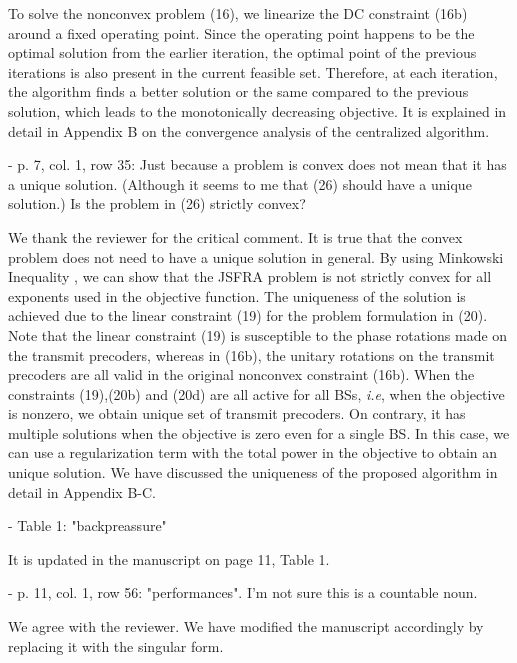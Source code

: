 \begin{itemize}
\begin{itemize}
\resp To solve the nonconvex problem (16), we linearize the DC constraint (16b) around a fixed operating point. Since the operating point happens to be the optimal solution from the earlier iteration, the optimal point of the previous iterations is also present in the current feasible set. Therefore, at each iteration, the algorithm finds a better solution or the same compared to the previous solution, which leads to the monotonically decreasing objective. It is explained in detail in Appendix B on the convergence analysis of the centralized algorithm.

 - p. 7, col. 1, row 35: Just because a problem is convex does not mean that it has a unique solution. (Although it seems to me that (26) should have a unique solution.) Is the problem in (26) strictly convex?

\resp We thank the reviewer for the critical comment. It is true that the convex problem does not need to have a unique solution in general. By using Minkowski Inequality , we can show that the JSFRA problem is not strictly convex for all exponents  used in the objective function. The uniqueness of the solution is achieved due to the linear constraint (19) for the problem formulation in (20). Note that the linear constraint (19) is susceptible to the phase rotations made on the transmit precoders, whereas in (16b), the unitary rotations on the transmit precoders are all valid in the original nonconvex constraint (16b). When the constraints (19),(20b) and (20d) are all active for all BSs, \textit{i.e}, when the objective is nonzero, we obtain unique set of transmit precoders. On contrary, it has multiple solutions when the objective is zero even for a single BS. In this case, we can use a regularization term with the total power in the objective to obtain an unique solution. We have discussed the uniqueness of the proposed algorithm in detail in Appendix B-C.

 - Table 1: "backpreassure"

\resp It is updated in the manuscript on page 11, Table 1.

 - p. 11, col. 1, row 56: "performances". I'm not sure this is a countable noun.

\resp We agree with the reviewer. We have modified the manuscript accordingly by replacing it with the singular form.

\end{itemize}

\end{itemize}